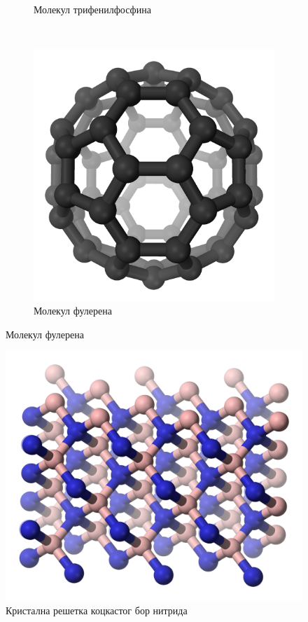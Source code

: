 \documentclass{report}
\theoremstyle{plain}
\theoremstyle{definition}
\begin{document}
\begin{figure}[h]
\begin{subfigure}{0.3\textwidth}
\caption{Молекул трифенилфосфина}
\end{subfigure}
~
\begin{subfigure}{0.3\textwidth}
\includegraphics[width=\textwidth]{molekul2}
\caption{Молекул фулерена}
\end{subfigure}
\end{figure}

\begin{figure}[h]
\centering
\includegraphics[width=\textwidth]{resetka}
\caption{Кристална решетка коцкастог бор нитрида}
\end{figure}
\end{document}
